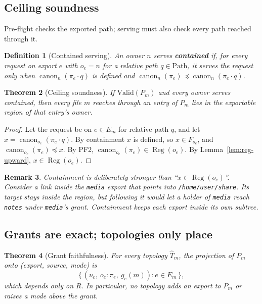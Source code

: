 \documentclass[11pt]{article}
\newcommand{\Path}{\text{Path}}
\DeclareMathOperator{\Reg}{Reg}
\DeclareMathOperator{\canon}{canon}
\newcommand{\PF}[1]{\textsf{PF#1}}
\theoremstyle{definitionbreak}
\newtheorem{definition}{Definition}[section]
\theoremstyle{plainbreak}
\newtheorem{theorem}[definition]{Theorem}
\theoremstyle{remarkbreak}
\newtheorem{remark}[definition]{Remark}
\begin{document}
\subsection{Ceiling soundness}

Pre-flight checks the exported path; serving must also check every path reached through it.

\begin{definition}[Contained serving]\label{def:contained}
An owner $n$ serves \textbf{contained} if, for every request on export $e$ with $o_e = n$ for a
relative path $q \in \Path$, it serves the request only when $\canon_n(\pi_e \cdot q)$ is
defined and $\canon_n(\pi_e) \preceq \canon_n(\pi_e \cdot q)$.
\end{definition}

\begin{theorem}[Ceiling soundness]\label{thm:ceiling}
If $\mathrm{Valid}(P_m)$ and every owner serves contained, then every file $m$ reaches through
an entry of $P_m$ lies in the exportable region of that entry's owner.
\end{theorem}

\begin{proof}
Let the request be on $e \in E_m$ for relative path $q$, and let
$x = \canon_{o_e}(\pi_e \cdot q)$. By containment $x$ is defined, so $x \in F_{o_e}$, and
$\canon_{o_e}(\pi_e) \preceq x$. By \PF{2}, $\canon_{o_e}(\pi_e) \in \Reg(o_e)$. By
Lemma~\ref{lem:reg-upward}, $x \in \Reg(o_e)$.
\end{proof}

\begin{remark}
Containment is deliberately stronger than ``$x \in \Reg(o_e)$''. Consider a link inside
the \texttt{media} export that points into \texttt{/home/user/share}. Its target stays inside the
region, but following it would let a holder of \texttt{media} reach \texttt{notes} under
\texttt{media}'s grant. Containment keeps each export inside its own subtree.
\end{remark}

\subsection{Grants are exact; topologies only place}

\begin{theorem}[Grant faithfulness]\label{thm:grant}
For every topology $\hat T_m$, the projection of $P_m$ onto (export, source, mode) is
\[
    \{\, (\nu_e,\ o_e{:}\pi_e,\ g_e(m)) : e \in E_m \,\},
\]
which depends only on $R$. In particular, no topology adds an export to $P_m$ or raises a mode
above the grant.
\end{theorem}
\end{document}
